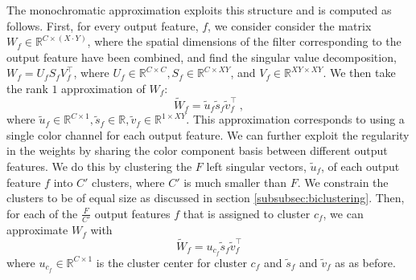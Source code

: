 The monochromatic approximation exploits this structure and is computed as follows.
First, for every output feature, $f$, we consider consider the matrix $W_f \in \mathbb{R}^{C \times (X\cdot Y) }$, 
where the spatial dimensions of the filter corresponding to the output feature have been combined, and find the singular value decomposition, 
$W_f = U_f S_f V_f^{\top}$,
where $U_f \in \mathbb{R}^{C \times C}, S_f \in \mathbb{R}^{C \times XY}$, and $V_f \in \mathbb{R}^{XY \times XY}$. 
We then take the rank $1$ approximation of $W_f$: 
\begin{equation}
\label{blo1}
	\tilde{W}_f = \tilde{u}_f \tilde{s}_f \tilde{v}_f^{\top} ~,
\end{equation}
where $\tilde{u}_f \in \mathbb{R}^{C \times 1}, \tilde{s}_f \in \mathbb{R}, \tilde{v}_f \in \mathbb{R}^{1 \times XY}$.
This approximation corresponds to using a single color channel for each output feature. 
We can further exploit the regularity in the weights by sharing the color component basis between different output features. 
We do this by clustering the $F$ left singular vectors, $\tilde{u}_f$, of each output feature $f$ into $C'$ clusters, 
where $C'$ is much smaller than $F$. We constrain the clusters to be of equal size as discussed in section \ref{subsubsec:biclustering}.  
Then, for each of the $\frac{F}{C'}$ output features $f$ that is assigned to cluster $c_f$, we can approximate $W_f$ with
\begin{equation}
\label{blo2}
	\tilde{W}_f = u_{c_f} \tilde{s}_f \tilde{v}_f^{\top}
\end{equation}
where $u_{c_f} \in \mathbb{R}^{C \times 1}$ is the cluster center for cluster $c_f$ and $\tilde{s}_f$ and $\tilde{v}_f$ as as before. 


